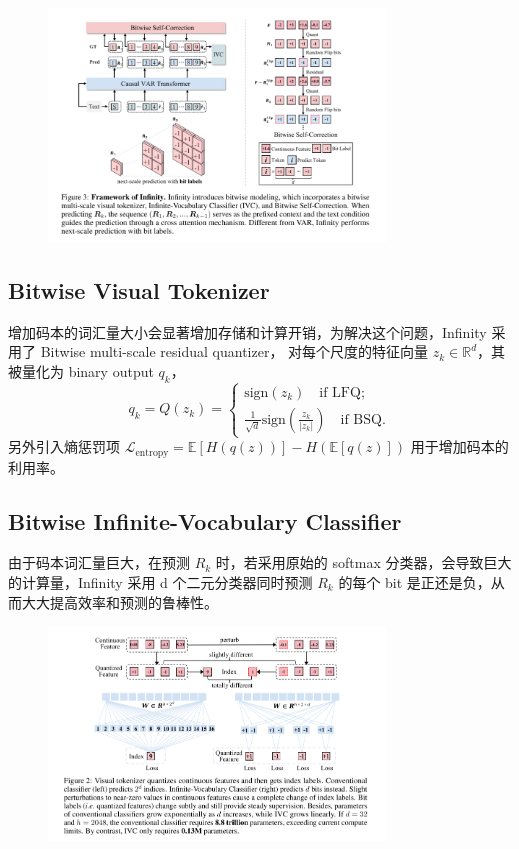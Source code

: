 \begin{figure}[htbp]
    \centering 
    \includegraphics[width=0.8\textwidth]{./fig/Framework of Infinity.png} 
\end{figure}

\subsection{Bitwise Visual Tokenizer}
增加码本的词汇量大小会显著增加存储和计算开销，为解决这个问题，Infinity 采用了 Bitwise multi-scale residual quantizer，
对每个尺度的特征向量 $z_k\in\mathbb{R}^d$，其被量化为 binary output $q_k$，
\begin{equation}
    q_k = Q(z_k) = \begin{cases}
        \text{sign}(z_k)\quad\text{if LFQ};\\
        \frac{1}{\sqrt{d}}\text{sign}(\frac{z_k}{|z_k|})\quad\text{if BSQ}.
    \end{cases}
\end{equation}
另外引入熵惩罚项 $\mathcal{L}_{\text{entropy}}=\mathbb{E}[H(q(z))]-H(\mathbb{E}[q(z)])$ 用于增加码本的利用率。

\subsection{Bitwise Infinite-Vocabulary Classifier}
由于码本词汇量巨大，在预测 $R_k$ 时，若采用原始的 softmax 分类器，会导致巨大的计算量，Infinity 采用 d 个二元分类器同时预测
$R_k$ 的每个 bit 是正还是负，从而大大提高效率和预测的鲁棒性。

\begin{figure}[htbp]
    \centering 
    \includegraphics[width=0.8\textwidth]{./fig/IVC.png} 
\end{figure}
